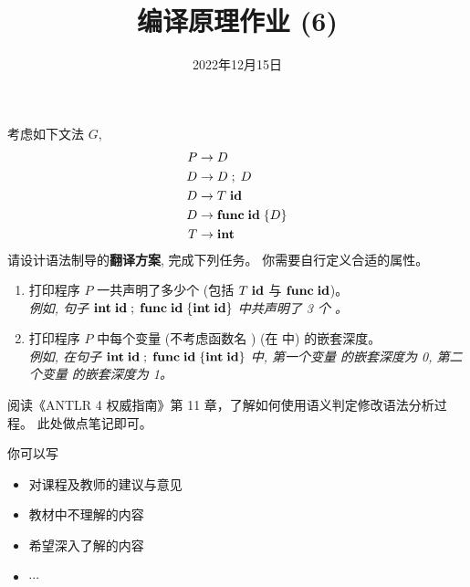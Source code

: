 \documentclass[a4paper, justified]{tufte-handout}
\title{编译原理作业 (6)}
\date{2022年12月15日}
\begin{document}
\maketitle
\noplagiarism %
\begin{abstract}
\end{abstract}
\beginrequired

\begin{problem}
  考虑如下文法 $G$,
  \begin{align*}
    P &\to D \\
    D &\to D \;;\; D \\
    D &\to T\; \text{\bf id} \\
    D &\to \text{\bf func}\; \text{\bf id}\; \{D\} \\
    T &\to \text{\bf int}
  \end{align*}
  请设计语法制导的{\bf 翻译方案}, 完成下列任务。
  你需要自行定义合适的属性。
  \begin{enumerate}[(1)]
    \item 打印程序 $P$ 一共声明了多少个 \idkw\; (包括 $T\; \text{\bf id}$ 与 $\text{\bf func}\; \text{\bf id}$)。\\
      {\it 例如, 句子 $\text{\bf int}\; \text{\bf id} \;;\; \text{\bf func}\; \text{\bf id}\; \{\text{\bf int}\; \text{\bf id}\}$ 中共声明了 3 个 \idkw。}
    \item 打印程序 $P$ 中每个变量 \idkw{} (不考虑函数名 \idkw) (在 \set{} 中) 的嵌套深度。\\
      {\it 例如, 在句子 $\text{\bf int}\; \text{\bf id} \;;\; \text{\bf func}\; \text{\bf id}\; \{\text{\bf int}\; \text{\bf id}\}$ 中,
        第一个变量 \idkw{} 的嵌套深度为 0, 第二个变量 \idkw{} 的嵌套深度为 1。}
  \end{enumerate}
\end{problem}

\begin{solution}
\end{solution}

\pagebreak
\begin{problem}
  阅读《ANTLR 4 权威指南》第 11 章，了解如何使用语义判定修改语法分析过程。
  此处做点笔记即可。
\end{problem}

\begin{solution}
\end{solution}



\beginfb

你可以写
\begin{itemize}
  \item 对课程及教师的建议与意见
  \item 教材中不理解的内容
  \item 希望深入了解的内容
  \item $\cdots$
\end{itemize}
\end{document}
